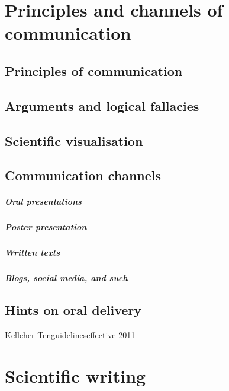 \documentclass{tufte-book}
\begin{document}
\chapter{Principles and channels of communication}


\section{Principles of communication}



\section{Arguments and logical fallacies}


\section{Scientific visualisation}


\section{Communication channels}

\paragraph{Oral presentations}

\paragraph{Poster presentation}

\paragraph{Written texts}

\paragraph{Blogs, social media, and such}


\section{Hints on oral delivery}



Kelleher-Tenguidelineseffective-2011




\chapter{Scientific writing}
\end{document}

